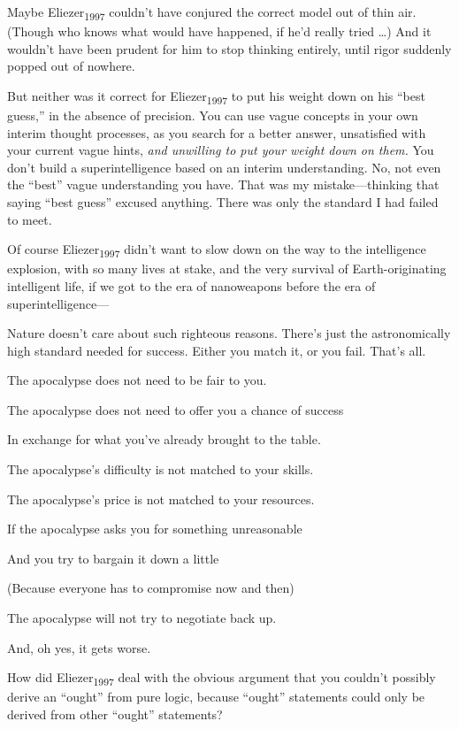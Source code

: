 {
 Maybe Eliezer\textsubscript{1997} couldn't have
conjured the correct model out of thin air. (Though who knows what
would have happened, if he'd really tried \ldots) And it
wouldn't have been prudent for him to stop thinking
entirely, until rigor suddenly popped out of nowhere.}

{
 But neither was it correct for Eliezer\textsubscript{1997} to put
his weight down on his ``best
guess,'' in the absence of precision. You can use
vague concepts in your own interim thought processes, as you search for
a better answer, unsatisfied with your current vague hints, \textit{and
unwilling to put your weight down on them.} You don't
build a superintelligence based on an interim understanding. No, not
even the ``best'' vague
understanding you have. That was my mistake---thinking that saying
``best guess'' excused anything.
There was only the standard I had failed to meet.}

{
 Of course Eliezer\textsubscript{1997} didn't want
to slow down on the way to the intelligence explosion, with so many
lives at stake, and the very survival of Earth-originating intelligent
life, if we got to the era of nanoweapons before the era of
superintelligence---}

{
 Nature doesn't care about such righteous reasons.
There's just the astronomically high standard needed
for success. Either you match it, or you fail. That's
all.}

{
 The apocalypse does not need to be fair to you.}

{
 The apocalypse does not need to offer you a chance of success}

{
 In exchange for what you've already brought to the
table.}

{
 The apocalypse's difficulty is not matched to your
skills.}

{
 The apocalypse's price is not matched to your
resources.}

{
 If the apocalypse asks you for something unreasonable}

{
 And you try to bargain it down a little}

{
 (Because everyone has to compromise now and then)}

{
 The apocalypse will not try to negotiate back up.}

{
 And, oh yes, it gets worse.}

{
 How did Eliezer\textsubscript{1997} deal with the obvious argument
that you couldn't possibly derive an
``ought'' from pure logic, because
``ought'' statements could only be
derived from other ``ought''
statements?}

